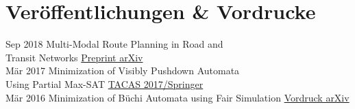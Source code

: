 \documentclass[letterpaper]{twentysecondcv_german} %
\begin{document}
\newpage

\makeprofile %


\section{Veröffentlichungen \& Vordrucke}
\begin{twenty} %
	\twentyitem
    		{Sep 2018}
		{}
        		{Multi-Modal Route Planning in Road and\\Transit Networks}
        		{\href{https://arxiv.org/abs/1809.05481}{Preprint arXiv}}
        		{}
        		{}\\
	\twentyitem
    		{Mär 2017}
		{}
        		{Minimization of Visibly Pushdown Automata\\Using Partial Max-SAT}
        		{\href{https://link.springer.com/chapter/10.1007/978-3-662-54577-5_27}{TACAS 2017/Springer}}
        		{}
        		{}\\
        	\twentyitem
    		{Mär 2016}
		{}
        		{Minimization of Büchi Automata using Fair Simulation}
        		{\href{https://arxiv.org/abs/1603.01107}{Vordruck arXiv}}
        		{}
        		{}\\
\end{twenty}

\end{document}
